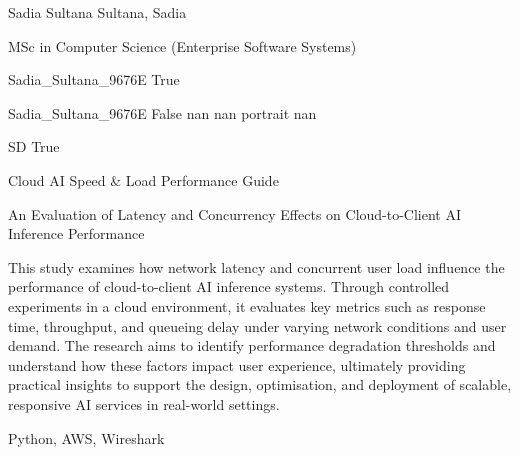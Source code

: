 
\begingroup{}\relax



\def\Key{Sadia_Sultana_9676E}

{Sadia Sultana}
{Sultana, Sadia}

{MSc in Computer Science (Enterprise Software Systems)}

{Sadia_Sultana_9676E}
{True}

{Sadia_Sultana_9676E}
{False}
{nan}
{nan}
{portrait}
{nan}

{SD}
{True}

{Cloud AI Speed \& Load Performance Guide}

{An Evaluation of Latency and Concurrency Effects on Cloud-to-Client AI Inference Performance}

{This study examines how network latency and concurrent user load influence the performance of cloud-to-client AI inference systems. Through controlled experiments in a cloud environment, it evaluates key metrics such as response time, throughput, and queueing delay under varying network conditions and user demand. The research aims to identify performance degradation thresholds and understand how these factors impact user experience, ultimately providing practical insights to support the design, optimisation, and deployment of scalable, responsive AI services in real-world settings.}

{Python, AWS, Wireshark}

